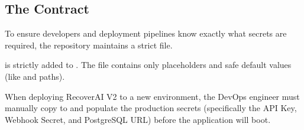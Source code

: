 \vspace{0.8cm}

\subsection{The  Contract}

To ensure developers and deployment pipelines know exactly what secrets are required, the repository maintains a strict  file. 

\begin{tcolorbox}[warningbox={No Secrets in Source Control}]
 is strictly added to . The  file contains only placeholders and safe default values (like  and  paths). 

When deploying RecoverAI V2 to a new environment, the DevOps engineer must manually copy  to  and populate the production secrets (specifically the API Key, Webhook Secret, and PostgreSQL URL) before the application will boot.
\end{tcolorbox}
